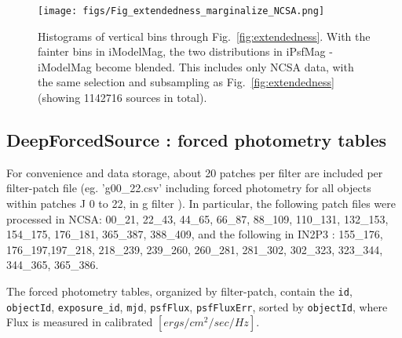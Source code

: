 \documentclass[fleqn,usenatbib]{mnras}  %
\begin{document}
\begin{figure*}
\texttt{[image: figs/Fig\_extendedness\_marginalize\_NCSA.png]}
\caption{Histograms of vertical bins through Fig.~\ref{fig:extendedness}. With the fainter bins in iModelMag, the two distributions in iPsfMag - iModelMag become blended. This includes only NCSA data, with the same selection and subsampling as Fig.~\ref{fig:extendedness} (showing 1142716 sources in total).}
\label{fig:extendedness_marginalized}
\end{figure*}



\subsection{DeepForcedSource : forced photometry tables}


For convenience and  data storage, about 20 patches per filter are included per filter-patch file (eg. 'g00\_22.csv' including forced photometry for all objects within patches J 0 to 22, in g filter  ). In particular, the following patch files  were processed in NCSA: 00\_21, 22\_43, 44\_65, 66\_87, 88\_109, 110\_131, 132\_153, 154\_175, 176\_181, 365\_387, 388\_409,  and the following in IN2P3 : 155\_176, 176\_197,197\_218, 218\_239, 239\_260, 260\_281, 281\_302, 302\_323, 323\_344, 344\_365, 365\_386.


The forced photometry tables, organized by filter-patch, contain the \verb|id|, \verb|objectId|, \verb|exposure_id|, \verb|mjd|, \verb|psfFlux|, \verb|psfFluxErr|, sorted by \verb|objectId|, where Flux is measured in calibrated $[ergs/ cm^{2} / sec / Hz]$.  





%


\end{document}
